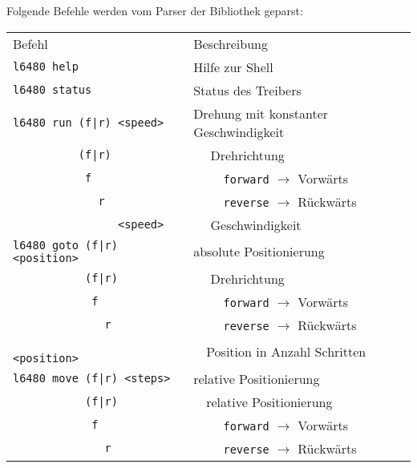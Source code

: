     Folgende Befehle werden vom Parser der Bibliothek geparst: 
    \begin{table}[h!]
        \centering
        \begin{tabular}{p{}p{}}
            \rowcolor{gray}  Befehl                              & Beschreibung \\
            \rowcolor{white} \verb?l6480 help                  ? & Hilfe zur Shell \\
            \rowcolor{lgray} \verb?l6480 status                ? & Status des Treibers \\
            \rowcolor{white} \verb?l6480 run (f|r) <speed>     ? & Drehung mit konstanter Geschwindigkeit \\
            \rowcolor{white} \verb?          (f|r)             ? & $\quad$ Drehrichtung \\
            \rowcolor{white} \verb?           f                ? & $\quad\quad$ \verb?forward? $\to$ Vorwärts \\
            \rowcolor{white} \verb?             r              ? & $\quad\quad$ \verb?reverse? $\to$ Rückwärts \\
            \rowcolor{white} \verb?                <speed>     ? & $\quad$ Geschwindigkeit \\
            \rowcolor{lgray} \verb?l6480 goto (f|r) <position> ?  & absolute Positionierung  \\
            \rowcolor{lgray} \verb?           (f|r)            ?  & $\quad$ Drehrichtung  \\
            \rowcolor{lgray} \verb?            f               ?      & $\quad\quad$ \verb?forward? $\to$ Vorwärts \\
            \rowcolor{lgray} \verb?              r             ?      & $\quad\quad$ \verb?reverse? $\to$ Rückwärts \\
            \rowcolor{lgray} \verb?                 <position> ? & $\quad$Position in Anzahl Schritten  \\
            \rowcolor{white} \verb?l6480 move (f|r) <steps>    ? & relative Positionierung \\
            \rowcolor{white} \verb?           (f|r)            ? & $\quad$relative Positionierung \\
            \rowcolor{white} \verb?            f               ?      & $\quad\quad$ \verb?forward? $\to$ Vorwärts \\
            \rowcolor{white} \verb?              r             ?      & $\quad\quad$ \verb?reverse? $\to$ Rückwärts \\

\end{tabular}
\end{table}
